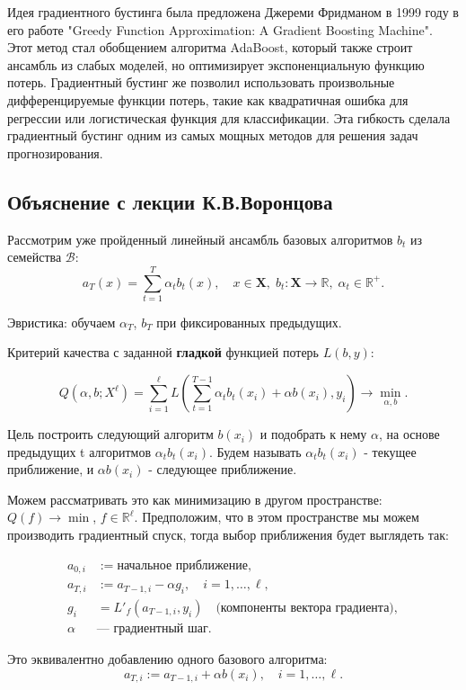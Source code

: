 Идея градиентного бустинга была предложена Джереми Фридманом в 1999 году в его работе "Greedy Function Approximation: A Gradient Boosting Machine". Этот метод стал обобщением алгоритма AdaBoost, который также строит ансамбль из слабых моделей, но оптимизирует экспоненциальную функцию потерь. Градиентный бустинг же позволил использовать произвольные дифференцируемые функции потерь, такие как квадратичная ошибка для регрессии или логистическая функция для классификации. Эта гибкость сделала градиентный бустинг одним из самых мощных методов для решения задач прогнозирования.

\subsection{Объяснение с лекции К.В.Воронцова}

Рассмотрим уже пройденный линейный ансамбль базовых алгоритмов $b_t$ из семейства $\mathcal{B}$:
\[
a_T(x) = \sum_{t=1}^{T} \alpha_t b_t(x), \quad x \in \textbf{X}, \; b_t : \textbf{X} \to \mathbb{R}, \; \alpha_t \in \mathbb{R}^+.
\]

Эвристика: обучаем $\alpha_T$, $b_T$ при фиксированных предыдущих.

Критерий качества с заданной \textbf{гладкой} функцией потерь $L(b, y)$:

\[
Q(\alpha, b; X^\ell) = \sum_{i=1}^\ell L\left(\sum_{t=1}^{T-1} \alpha_t b_t(x_i) + \alpha b(x_i), y_i \right) \to \min_{\alpha, b}.
\]

Цель построить следующий алгоритм $b(x_i)$ и подобрать к нему $\alpha$, на основе предыдущих t алгоритмов $\alpha_t b_t(x_i)$.  
Будем называть $\alpha_t b_t(x_i)$ - текущее приближение, и $\alpha b(x_i)$ - следующее приближение. 

Можем рассматривать это как минимизацию в другом пространстве: $Q(f) \to \min$, $f \in \mathbb{R}^\ell$. Предположим, что в этом пространстве мы можем производить градиентный спуск, тогда выбор приближения будет выглядеть так:

\begin{align*}
a_{0,i} & := \text{начальное приближение}, \\
a_{T,i} & := a_{T-1,i} - \alpha g_i, \quad i = 1, \dots, \ell, \\
g_i & = L'_f(a_{T-1,i}, y_i) \quad \text{(компоненты вектора градиента)}, \\
\alpha & \text{--- градиентный шаг}.
\end{align*}

Это эквивалентно добавлению одного базового алгоритма:
\[
a_{T,i} := a_{T-1,i} + \alpha b(x_i), \quad i = 1, \dots, \ell.
\]

